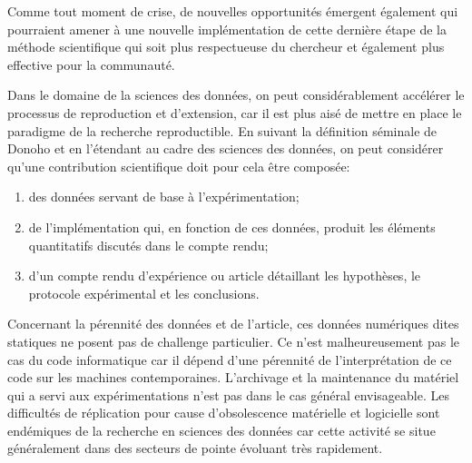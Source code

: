 Comme tout moment de crise, de nouvelles opportunités émergent également qui pourraient amener à une nouvelle implémentation de cette dernière étape de la méthode scientifique qui soit plus respectueuse du chercheur et également plus effective pour la communauté. %


Dans le domaine de la sciences des données, on peut considérablement accélérer le processus de reproduction et d'extension, car il est plus aisé de mettre en place le paradigme de la recherche reproductible. En suivant la définition séminale de Donoho et en l'étendant au cadre des sciences des données, on peut considérer qu'une contribution scientifique doit pour cela être composée:
\begin{enumerate}
  \item des données servant de base à l'expérimentation;
  \item de l'implémentation qui, en fonction de ces données, produit les éléments quantitatifs discutés dans le compte rendu;
  \item d'un compte rendu d'expérience ou article détaillant les hypothèses, le protocole expérimental et les conclusions.
\end{enumerate}

Concernant la pérennité des données et de l'article, ces données numériques dites \og statiques \fg ne posent pas de challenge particulier. Ce n'est malheureusement pas le cas du code informatique car il dépend d'une pérennité de l'interprétation de ce code sur les machines contemporaines. L'archivage et la maintenance du matériel qui a servi aux expérimentations n'est pas dans le cas général envisageable. Les difficultés de réplication pour cause d'obsolescence matérielle et logicielle sont endémiques de la recherche en sciences des données car cette activité se situe généralement dans des secteurs de pointe évoluant très rapidement.

